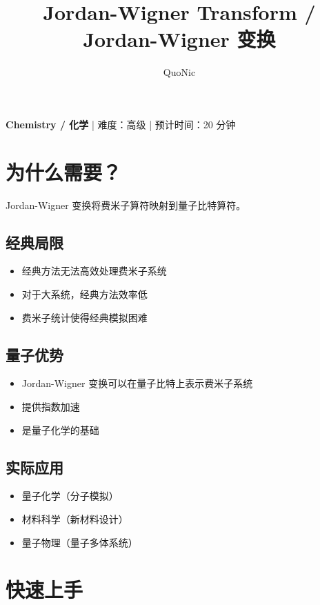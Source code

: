 \documentclass[12pt,a4paper]{article}
\title{Jordan-Wigner Transform / Jordan-Wigner 变换}
\author{QuoNic}
\date{}
\begin{document}
\maketitle

\begin{center}
\textbf{Chemistry / 化学} | 难度：高级 | 预计时间：20 分钟
\end{center}

\tableofcontents
\newpage

\section{为什么需要？}

Jordan-Wigner 变换将费米子算符映射到量子比特算符。

\subsection{经典局限}
\begin{itemize}
  \item 经典方法无法高效处理费米子系统
  \item 对于大系统，经典方法效率低
  \item 费米子统计使得经典模拟困难
\end{itemize}

\subsection{量子优势}
\begin{itemize}
  \item Jordan-Wigner 变换可以在量子比特上表示费米子系统
  \item 提供指数加速
  \item 是量子化学的基础
\end{itemize}

\subsection{实际应用}
\begin{itemize}
  \item 量子化学（分子模拟）
  \item 材料科学（新材料设计）
  \item 量子物理（量子多体系统）
\end{itemize}

\section{快速上手}
\end{document}
